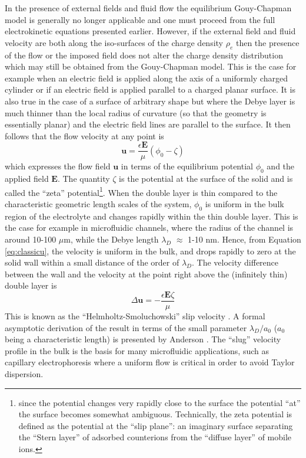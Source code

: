 In the presence of external fields and fluid flow the equilibrium Gouy-Chapman model is generally no longer applicable and one must proceed from the full electrokinetic equations presented earlier. However, if the external field and fluid velocity are both along the iso-surfaces of the charge density $\rho_e$ then the presence of the flow or the imposed field does not alter the charge density distribution which may still be obtained from the Gouy-Chapman model. This is the case for example when an electric field is applied along the axis of a uniformly charged cylinder or if an electric field is applied parallel to a charged planar surface. It is also true in the case of a surface of arbitrary shape but where the Debye layer is much thinner than the local radius of curvature (so that the geometry is essentially planar) and the electric field lines are parallel to the surface. 
It then follows that the flow 
velocity at any point is 
\begin{equation}
\mathbf{u} = \frac{\epsilon \mathbf{E}}{\mu}\left(\phi_0 - \zeta\right)
\label{eq:classicu}
\end{equation}
which expresses the flow field $\mathbf{u}$ in terms of the equilibrium potential $\phi_0$ and the applied field 
$\mathbf{E}$. The quantity 
$\zeta$ is the potential at the surface of the solid and is called the ``zeta'' potential\footnote{since the potential 
changes very rapidly close to the surface the potential ``at'' the surface becomes somewhat ambiguous. Technically,
the zeta potential is defined as the potential at the ``slip plane'': an imaginary 
surface separating the ``Stern layer''  of adsorbed counterions from the ``diffuse layer'' of mobile ions.}.
When the double layer is thin compared to the characteristic geometric length scales of the system, $\phi_0$ is uniform in the bulk region of the electrolyte and changes rapidly within the thin double layer. This is the case for example in 
microfluidic channels, where the radius of the channel is around 10-100 $\mu$m, while the Debye length $\lambda_D$ $\approx$ 1-10 nm. Hence, from Equation \ref{eq:classicu}, the velocity is uniform in the bulk, and drops rapidly to zero at the solid wall within a small distance of the order of $\lambda_D$. The velocity difference between the wall and the velocity at the point right above the (infinitely thin) double layer is
\begin{equation}
\Delta \mathbf{u} = -\frac{\epsilon \mathbf{E} \zeta}{\mu}
\label{eq:HSslip}
\end{equation}
This is known as the ``Helmholtz-Smoluchowski'' slip velocity \cite{Helmholtz,Smoluchowski1924}. A formal asymptotic derivation of the result in terms of the small parameter $\lambda_D/a_0$ ($a_0$ being a characteristic length) is presented by Anderson \cite{anderson1985effect}. The ``slug'' velocity profile in the bulk is the basis for many microfluidic applications, such as capillary electrophoresis \cite{ghosal2006electrokinetic} where a uniform flow is critical in order to avoid Taylor dispersion.

